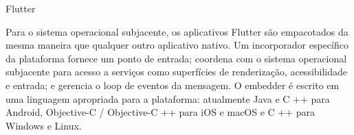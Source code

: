 \documentclass[usenames,dvipsnames,10pt]{beamer}
\begin{document}

\begin{frame}{Flutter}

Para o sistema operacional subjacente, os aplicativos Flutter são empacotados da mesma maneira que qualquer outro aplicativo nativo. Um incorporador específico da plataforma fornece um ponto de entrada; coordena com o sistema operacional subjacente para acesso a serviços como superfícies de renderização, acessibilidade e entrada; e gerencia o loop de eventos da mensagem. O embedder é escrito em uma linguagem apropriada para a plataforma: atualmente Java e C ++ para Android, Objective-C / Objective-C ++ para iOS e macOS e C ++ para Windows e Linux.

\end{frame}

\end{document}
